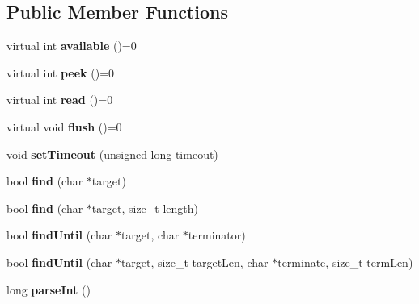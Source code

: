 \subsection*{Public Member Functions}
\begin{DoxyCompactItemize}
\item 
\hypertarget{class_stream_a9c98a763395005c08ce95afb2f06c7b1}{}virtual int {\bfseries available} ()=0\label{class_stream_a9c98a763395005c08ce95afb2f06c7b1}

\item 
\hypertarget{class_stream_a30c3c212ec6ea67277a708c5ea2501a5}{}virtual int {\bfseries peek} ()=0\label{class_stream_a30c3c212ec6ea67277a708c5ea2501a5}

\item 
\hypertarget{class_stream_aea5dee9fcb038148515b7c9212d38dc0}{}virtual int {\bfseries read} ()=0\label{class_stream_aea5dee9fcb038148515b7c9212d38dc0}

\item 
\hypertarget{class_stream_aa3ef2c34f152a0b2ea8de9139b9461da}{}virtual void {\bfseries flush} ()=0\label{class_stream_aa3ef2c34f152a0b2ea8de9139b9461da}

\item 
\hypertarget{class_stream_a851dd6dc74d52389de04f99648478db5}{}void {\bfseries set\+Timeout} (unsigned long timeout)\label{class_stream_a851dd6dc74d52389de04f99648478db5}

\item 
\hypertarget{class_stream_a4bab30ccd324efd461dee46a2339f673}{}bool {\bfseries find} (char $\ast$target)\label{class_stream_a4bab30ccd324efd461dee46a2339f673}

\item 
\hypertarget{class_stream_ad851401f2318cdb1de05707e021b81d9}{}bool {\bfseries find} (char $\ast$target, size\+\_\+t length)\label{class_stream_ad851401f2318cdb1de05707e021b81d9}

\item 
\hypertarget{class_stream_ad1f5f6600832396fb38a897baf4de35b}{}bool {\bfseries find\+Until} (char $\ast$target, char $\ast$terminator)\label{class_stream_ad1f5f6600832396fb38a897baf4de35b}

\item 
\hypertarget{class_stream_a3a9497de614792103ab8cb4759e01a69}{}bool {\bfseries find\+Until} (char $\ast$target, size\+\_\+t target\+Len, char $\ast$terminate, size\+\_\+t term\+Len)\label{class_stream_a3a9497de614792103ab8cb4759e01a69}

\item 
\hypertarget{class_stream_a497ffcbcb4d5bb889a8fde487bcc1b98}{}long {\bfseries parse\+Int} ()\label{class_stream_a497ffcbcb4d5bb889a8fde487bcc1b98}


\end{DoxyCompactItemize}
